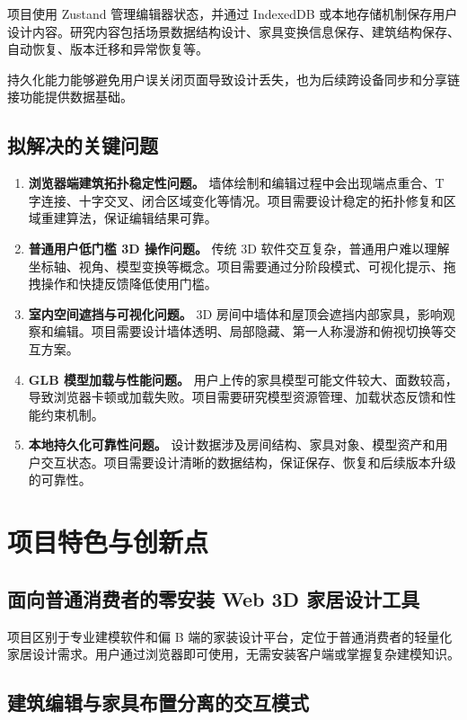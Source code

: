 \documentclass[UTF8,fontset=fandol,zihao=-4]{ctexart}
\begin{document}
项目使用 Zustand 管理编辑器状态，并通过 IndexedDB 或本地存储机制保存用户设计内容。研究内容包括场景数据结构设计、家具变换信息保存、建筑结构保存、自动恢复、版本迁移和异常恢复等。

持久化能力能够避免用户误关闭页面导致设计丢失，也为后续跨设备同步和分享链接功能提供数据基础。

\subsection{拟解决的关键问题}

\begin{enumerate}
  \item \textbf{浏览器端建筑拓扑稳定性问题。} 墙体绘制和编辑过程中会出现端点重合、T 字连接、十字交叉、闭合区域变化等情况。项目需要设计稳定的拓扑修复和区域重建算法，保证编辑结果可靠。
  \item \textbf{普通用户低门槛 3D 操作问题。} 传统 3D 软件交互复杂，普通用户难以理解坐标轴、视角、模型变换等概念。项目需要通过分阶段模式、可视化提示、拖拽操作和快捷反馈降低使用门槛。
  \item \textbf{室内空间遮挡与可视化问题。} 3D 房间中墙体和屋顶会遮挡内部家具，影响观察和编辑。项目需要设计墙体透明、局部隐藏、第一人称漫游和俯视切换等交互方案。
  \item \textbf{GLB 模型加载与性能问题。} 用户上传的家具模型可能文件较大、面数较高，导致浏览器卡顿或加载失败。项目需要研究模型资源管理、加载状态反馈和性能约束机制。
  \item \textbf{本地持久化可靠性问题。} 设计数据涉及房间结构、家具对象、模型资产和用户交互状态。项目需要设计清晰的数据结构，保证保存、恢复和后续版本升级的可靠性。
\end{enumerate}

\section{项目特色与创新点}

\subsection{面向普通消费者的零安装 Web 3D 家居设计工具}

项目区别于专业建模软件和偏 B 端的家装设计平台，定位于普通消费者的轻量化家居设计需求。用户通过浏览器即可使用，无需安装客户端或掌握复杂建模知识。

\subsection{建筑编辑与家具布置分离的交互模式}
\end{document}
